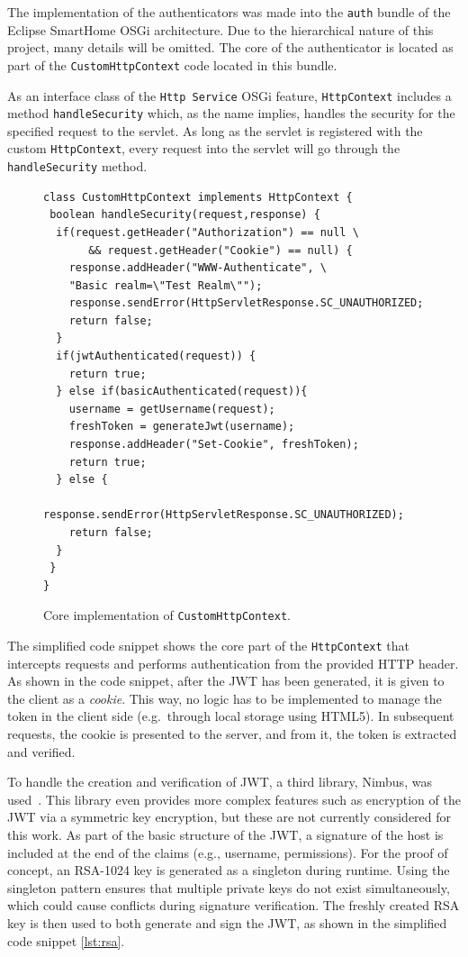 \documentclass[12pt]{article}
\newcommand{\TODO}{\todo[inline]}
\begin{document}
The implementation of the authenticators was made into the \texttt{auth} bundle of the Eclipse SmartHome OSGi architecture. Due to the hierarchical nature of this project, many details will be omitted.  The core of the authenticator is located as part of the \texttt{CustomHttpContext} code located in this bundle.

As an interface class of the \texttt{Http Service} OSGi feature, \texttt{HttpContext} includes a method \texttt{handleSecurity} which, as the name implies, handles the security for the specified request to the servlet. As long as the servlet is registered with the custom \texttt{HttpContext}, every request into the servlet will go through the \texttt{handleSecurity} method.

\TODO{FIX HYPHEN ISSUES AND REF TO CODE SNIPPET INSTEAD OF FIG}
\begin{figure} [htb]
  \begin{lstlisting}
class CustomHttpContext implements HttpContext {   
 boolean handleSecurity(request,response) {
  if(request.getHeader("Authorization") == null \
       && request.getHeader("Cookie") == null) {
    response.addHeader("WWW-Authenticate", \
	"Basic realm=\"Test Realm\"");
    response.sendError(HttpServletResponse.SC_UNAUTHORIZED;
    return false;
  }	    
  if(jwtAuthenticated(request)) {
    return true;		
  } else if(basicAuthenticated(request)){
    username = getUsername(request);
    freshToken = generateJwt(username);
    response.addHeader("Set-Cookie", freshToken);
    return true;
  } else {
    response.sendError(HttpServletResponse.SC_UNAUTHORIZED);
    return false;
  }
 }
}
\end{lstlisting}
\caption{Core implementation of \texttt{CustomHttpContext}.}
\label{lst:core_impl}
\end{figure}

The simplified code snippet shows the core part of the \texttt{HttpContext} that intercepts requests and performs authentication from the provided HTTP header. As shown in the code snippet, after the JWT has been generated, it is given to the client as a \emph{cookie}. This way, no logic has to be implemented to manage the token in the client side (e.g.\ through local storage using HTML5). In subsequent requests, the cookie is presented to the server, and from it, the token is extracted and verified.

To handle the creation and verification of JWT, a third library, Nimbus, was used~\cite{nimbus}. This library even provides more complex features such as encryption of the JWT via a symmetric key encryption, but these are not currently considered for this work. As part of the basic structure of the JWT, a signature of the host is included at the end of the claims (e.g., username, permissions). For the proof of concept, an RSA-1024 key is generated as a singleton during runtime. Using the singleton pattern ensures that multiple private keys do not exist simultaneously, which could cause conflicts during signature verification. The freshly created RSA key is then used to both generate and sign the JWT, as shown in the simplified code snippet \ref{lst:rsa}.
\end{document}
